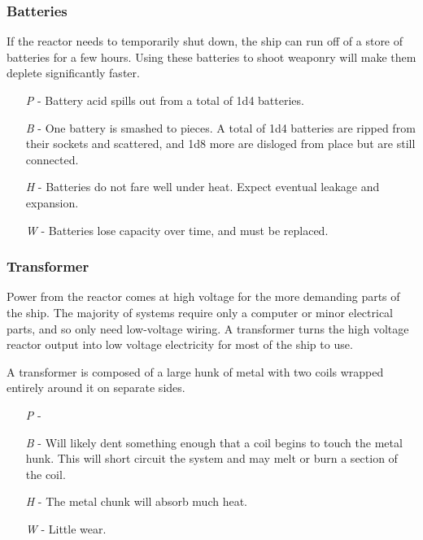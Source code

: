 \documentclass[a4paper]{article}
\begin{document}
\vspace{-0.5cm} \hspace{-18pt} \subsubsection{Batteries} \label{grid_batteries} \vspace{-0.2cm}
If the reactor needs to temporarily shut down, the ship can run off of a store of batteries for a few hours. Using these batteries to shoot weaponry will make them deplete significantly faster.
\begin{enumerate}
\item [\textit{P}] - Battery acid spills out from a total of 1d4 batteries.
\item [\textit{B}] - One battery is smashed to pieces. A total of 1d4 batteries are ripped from their sockets and scattered, and 1d8 more are disloged from place but are still connected.
\item [\textit{H}] - Batteries do not fare well under heat. Expect eventual leakage and expansion. 
\item [\textit{W}] - Batteries lose capacity over time, and must be replaced.
\end{enumerate}

\vspace{-0.5cm} \hspace{-18pt} \subsubsection{Transformer} \label{grid_transformer} \vspace{-0.2cm}
Power from the reactor comes at high voltage for the more demanding parts of the ship. The majority of systems require only a computer or minor electrical parts, and so only need low-voltage wiring. A transformer turns the high voltage reactor output into low voltage electricity for most of the ship to use.

A transformer is composed of a large hunk of metal with two coils wrapped entirely around it on separate sides. 
\begin{enumerate}
\item [\textit{P}] - 
\item [\textit{B}] - Will likely dent something enough that a coil begins to touch the metal hunk. This will short circuit the system and may melt or burn a section of the coil.
\item [\textit{H}] - The metal chunk will absorb much heat.
\item [\textit{W}] - Little wear.
\end{enumerate}
\end{document}
